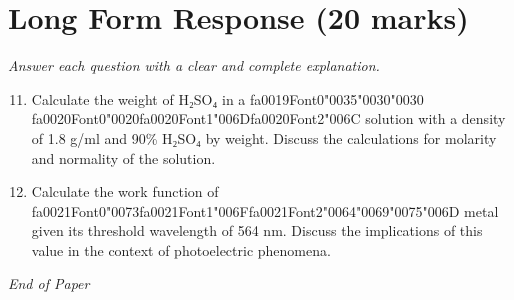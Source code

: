 \documentclass[12pt]{article}
\begin{document}
\section*{Long Form Response (20 marks)}
\textit{Answer each question with a clear and complete explanation.}
\begin{enumerate}[label=\arabic*.]
\setcounter{enumi}{10}
\item Calculate the weight of H₂SO₄ in a {\csname fa0019Font0\endcsname\char"0035}{\char"0030}{\char"0030} {\csname fa0020Font0\endcsname\char"0020}{\csname fa0020Font1\endcsname\char"006D}{\csname fa0020Font2\endcsname\char"006C} solution with a density of 1.8 g/ml and 90\%
H₂SO₄ by weight. Discuss the calculations for molarity and normality of the solution.
\item Calculate the work function of {\csname fa0021Font0\endcsname\char"0073}{\csname fa0021Font1\endcsname\char"006F}{\csname fa0021Font2\endcsname\char"0064}{\char"0069}{\char"0075}{\char"006D} metal given its threshold wavelength of 564 nm.
Discuss the implications of this value in the context of photoelectric phenomena.
\end{enumerate}

\vfill
\noindent\textit{End of Paper}
\end{document}
